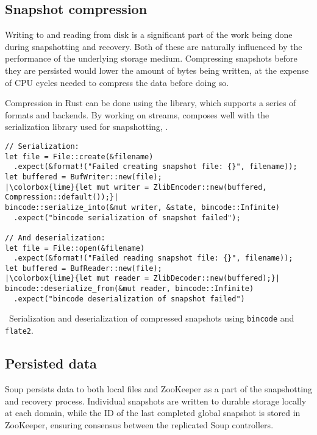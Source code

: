 \subsection{Snapshot compression}

Writing to and reading from disk is a significant part of the work being done
during snapshotting and recovery. Both of these are naturally influenced by the
performance of the underlying storage medium. Compressing snapshots before they
are persisted would lower the amount of bytes being written, at the expense of
CPU cycles needed to compress the data before doing so.

Compression in Rust can be done using the 
library, which supports a series of formats and
backends. By working on streams,  composes well with the
serialization library used for snapshotting, .

\begin{listing}[H]
  \begin{verbatim}
// Serialization:
let file = File::create(&filename)
  .expect(&format!("Failed creating snapshot file: {}", filename));
let buffered = BufWriter::new(file);
|\colorbox{lime}{let mut writer = ZlibEncoder::new(buffered, Compression::default());}|
bincode::serialize_into(&mut writer, &state, bincode::Infinite)
  .expect("bincode serialization of snapshot failed");

// And deserialization:
let file = File::open(&filename)
  .expect(&format!("Failed reading snapshot file: {}", filename));
let buffered = BufReader::new(file);
|\colorbox{lime}{let mut reader = ZlibDecoder::new(buffered);}|
bincode::deserialize_from(&mut reader, bincode::Infinite)
  .expect("bincode deserialization of snapshot failed")
  \end{verbatim}
  \caption{\
    Serialization and deserialization of compressed snapshots using
    \texttt{bincode} and \texttt{flate2}.
  }
\end{listing}

\subsection{Persisted data}

Soup persists data to both local files and ZooKeeper as a part of the
snapshotting and recovery process. Individual snapshots are written to durable
storage locally at each domain, while the ID of the last completed global
snapshot is stored in ZooKeeper, ensuring consensus between the replicated Soup
controllers.

